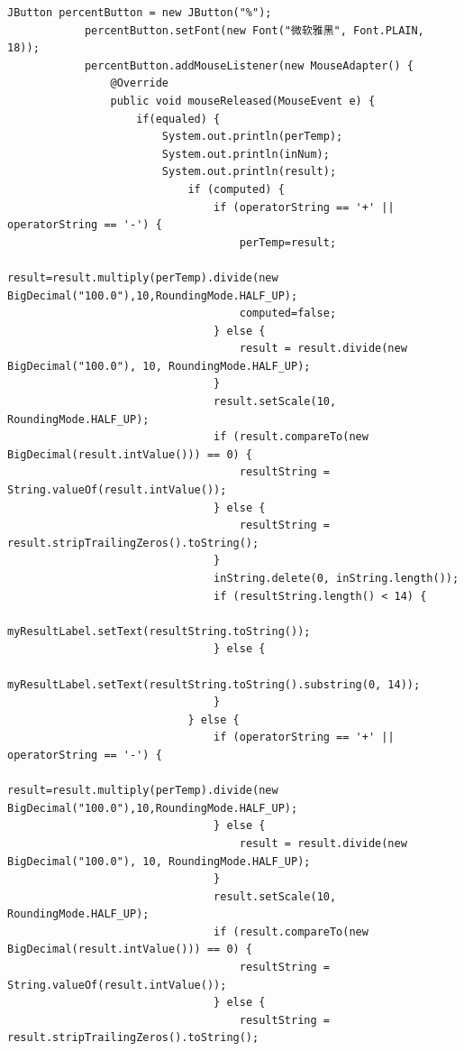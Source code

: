 \documentclass{ctexart}
\begin{document}
\begin{lstlisting}[caption=冗杂的代码]
            JButton percentButton = new JButton("%");
            percentButton.setFont(new Font("微软雅黑", Font.PLAIN, 18));
            percentButton.addMouseListener(new MouseAdapter() {
                @Override
                public void mouseReleased(MouseEvent e) {
                    if(equaled) {
                        System.out.println(perTemp);
                        System.out.println(inNum);
                        System.out.println(result);
                            if (computed) {
                                if (operatorString == '+' || operatorString == '-') {
                                    perTemp=result;
                                    result=result.multiply(perTemp).divide(new BigDecimal("100.0"),10,RoundingMode.HALF_UP);
                                    computed=false;
                                } else {
                                    result = result.divide(new BigDecimal("100.0"), 10, RoundingMode.HALF_UP);
                                }
                                result.setScale(10, RoundingMode.HALF_UP);
                                if (result.compareTo(new BigDecimal(result.intValue())) == 0) {
                                    resultString = String.valueOf(result.intValue());
                                } else {
                                    resultString = result.stripTrailingZeros().toString();
                                }
                                inString.delete(0, inString.length());
                                if (resultString.length() < 14) {
                                    myResultLabel.setText(resultString.toString());
                                } else {
                                    myResultLabel.setText(resultString.toString().substring(0, 14));
                                } 
                            } else {
                                if (operatorString == '+' || operatorString == '-') {
                                    result=result.multiply(perTemp).divide(new BigDecimal("100.0"),10,RoundingMode.HALF_UP);
                                } else {
                                    result = result.divide(new BigDecimal("100.0"), 10, RoundingMode.HALF_UP);
                                }
                                result.setScale(10, RoundingMode.HALF_UP);
                                if (result.compareTo(new BigDecimal(result.intValue())) == 0) {
                                    resultString = String.valueOf(result.intValue());
                                } else {
                                    resultString = result.stripTrailingZeros().toString();

\end{lstlisting}
\end{document}
